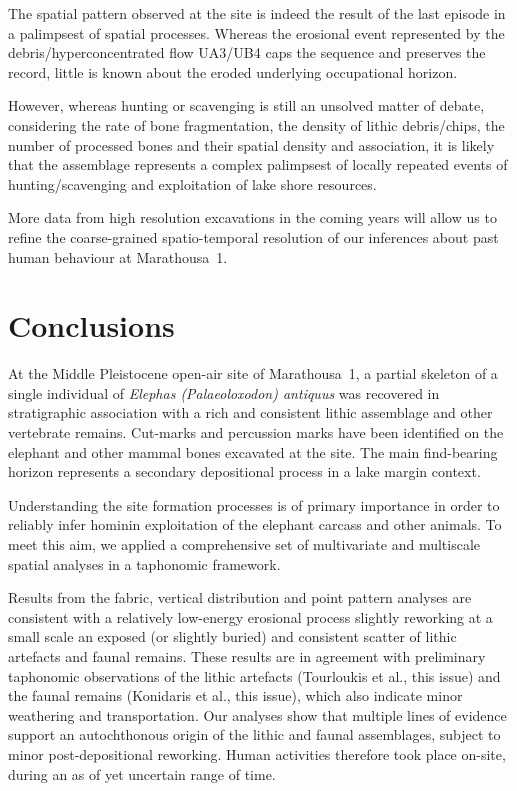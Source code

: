 \documentclass[preprint,authoryear,times]{elsarticle} %
\begin{document}
The spatial pattern observed at the site is indeed the result of the last episode in a palimpsest of spatial processes. Whereas the erosional event represented by the debris/hyperconcentrated flow UA3/UB4 caps the sequence and preserves the record, little is known about the eroded underlying occupational horizon.

However, whereas hunting or scavenging is still an unsolved matter of debate, considering the rate of bone fragmentation, the density of lithic debris/chips, the number of processed bones and their spatial density and association, it is likely that the assemblage represents a complex palimpsest of locally repeated events of hunting/scavenging and exploitation of lake shore resources. %

More data from high resolution excavations in the coming years will allow us to refine the coarse-grained spatio-temporal resolution of our inferences about past human behaviour at Marathousa~1.

\section{Conclusions}

At the Middle Pleistocene open-air site of Marathousa~1, a partial skeleton of a single individual of \emph{Elephas (Palaeoloxodon) antiquus} was recovered in stratigraphic association with a rich and consistent lithic assemblage and other vertebrate remains. Cut-marks and percussion marks have been identified on the elephant and other mammal bones excavated at the site. The main find-bearing horizon represents a secondary depositional process in a lake margin context.

Understanding the site formation processes is of primary importance in order to reliably infer hominin exploitation of the elephant carcass and other animals. To meet this aim, we applied a comprehensive set of multivariate and multiscale spatial analyses in a taphonomic framework.

Results from the fabric, vertical distribution and point pattern analyses are consistent with a relatively low-energy erosional process slightly reworking at a small scale an exposed (or slightly buried) and consistent scatter of lithic artefacts and faunal remains. These results are in agreement with preliminary taphonomic observations of the lithic artefacts (Tourloukis et al., this issue) and the faunal remains (Konidaris et al., this issue), which also indicate minor weathering and transportation. Our analyses show that multiple lines of evidence support an autochthonous origin of the lithic and faunal assemblages, subject to minor post-depositional reworking. Human activities therefore took place on-site, during an as of yet uncertain range of time.
\end{document}
